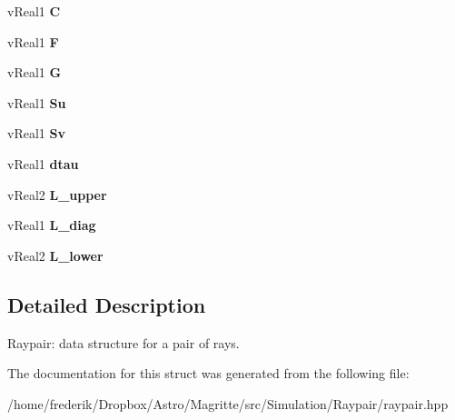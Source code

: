 \begin{DoxyCompactItemize}
v\+Real1 {\bfseries C}
\item 
\mbox{\label{structRayPair_ad1a6c1cd049ac78951e81a0004fac509}} 
v\+Real1 {\bfseries F}
\item 
\mbox{\label{structRayPair_af470438294ee00dc5ee8fb234dc7e902}} 
v\+Real1 {\bfseries G}
\item 
\mbox{\label{structRayPair_aa739bea2610536c390aa7cb426a9566d}} 
v\+Real1 {\bfseries Su}
\item 
\mbox{\label{structRayPair_a96c26e06d435e111feeebaf60ae7e5de}} 
v\+Real1 {\bfseries Sv}
\item 
\mbox{\label{structRayPair_ab07e9d39d005dd445eedd6b7a6768d19}} 
v\+Real1 {\bfseries dtau}
\item 
\mbox{\label{structRayPair_a2339405c3267e1b19677ae62ffd1b379}} 
v\+Real2 {\bfseries L\+\_\+upper}
\item 
\mbox{\label{structRayPair_ac394e4ffc8421fe3d842a61d0ffcb163}} 
v\+Real1 {\bfseries L\+\_\+diag}
\item 
\mbox{\label{structRayPair_ab27b18f971910e9cdfca09bdbb3c7ea4}} 
v\+Real2 {\bfseries L\+\_\+lower}
\end{DoxyCompactItemize}


\subsection{Detailed Description}
Raypair\+: data structure for a pair of rays. 

The documentation for this struct was generated from the following file\+:\begin{DoxyCompactItemize}
\item 
/home/frederik/\+Dropbox/\+Astro/\+Magritte/src/\+Simulation/\+Raypair/raypair.\+hpp\end{DoxyCompactItemize}
